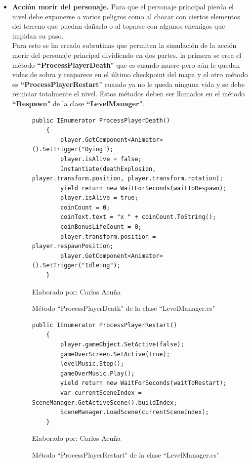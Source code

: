 \documentclass[a4paper, openright, 12pt]{report}
\begin{document}
\begin{itemize}
\item \textbf{Acción morir del personaje.} Para que el personaje principal pierda el nivel debe exponerse a varios peligros como al chocar con ciertos elementos del terreno que puedan dañarlo o al toparse con algunos enemigos que impidan su paso.\\
Para esto se ha creado subrutinas que permiten la simulación de la acción morir del personaje principal dividiendo en dos partes, la primera se crea el método \textbf{``ProcessPlayerDeath"} que es cuando muere pero aún le quedan vidas de sobra y reaparece en el último checkpoint del mapa y el otro método es \textbf{``ProcessPlayerRestart"} cuando ya no le queda ninguna vida y se debe reiniciar totalmente el nivel. Estos métodos deben ser llamados en el método \textbf{``Respawn"} de la clase \textbf{``LevelManager"}. 

\begin{figure}[h]
\captionsetup{justification=centering,margin=2cm}
\centering
\lstset{language=C, breaklines=true, basicstyle=\footnotesize}
\lstset{numbers=left, numberstyle=\tiny, stepnumber=1, numbersep=-2pt}
\captionsetup{justification=centering,margin=2cm}
\begin{lstlisting}[frame=single]
  public IEnumerator ProcessPlayerDeath()
    {
        player.GetComponent<Animator>().SetTrigger("Dying");
        player.isAlive = false;
        Instantiate(deathExplosion, player.transform.position, player.transform.rotation);
        yield return new WaitForSeconds(waitToRespawn);
        player.isAlive = true;
        coinCount = 0;
        coinText.text = "x " + coinCount.ToString();
        coinBonusLifeCount = 0;
        player.transform.position = player.respawnPosition;
        player.GetComponent<Animator>().SetTrigger("Idleing");
    }
\end{lstlisting}
\caption{Método ``ProcessPlayerDeath" de la clase ``LevelManager.cs"}
Elaborado por: Carlos Acuña
\end{figure}

\begin{figure}[h]
\captionsetup{justification=centering,margin=2cm}
\centering
\lstset{language=C, breaklines=true, basicstyle=\footnotesize}
\lstset{numbers=left, numberstyle=\tiny, stepnumber=1, numbersep=-2pt}
\captionsetup{justification=centering,margin=2cm}
\begin{lstlisting}[frame=single]
  public IEnumerator ProcessPlayerRestart()
    {
        player.gameObject.SetActive(false);
        gameOverScreen.SetActive(true);
        levelMusic.Stop();
        gameOverMusic.Play();
        yield return new WaitForSeconds(waitToRestart);
        var currentSceneIndex = SceneManager.GetActiveScene().buildIndex;
        SceneManager.LoadScene(currentSceneIndex);
    }
\end{lstlisting}
\caption{Método ``ProcessPlayerRestart" de la clase ``LevelManager.cs"}
Elaborado por: Carlos Acuña
\end{figure}


\end{itemize}
\end{document}
